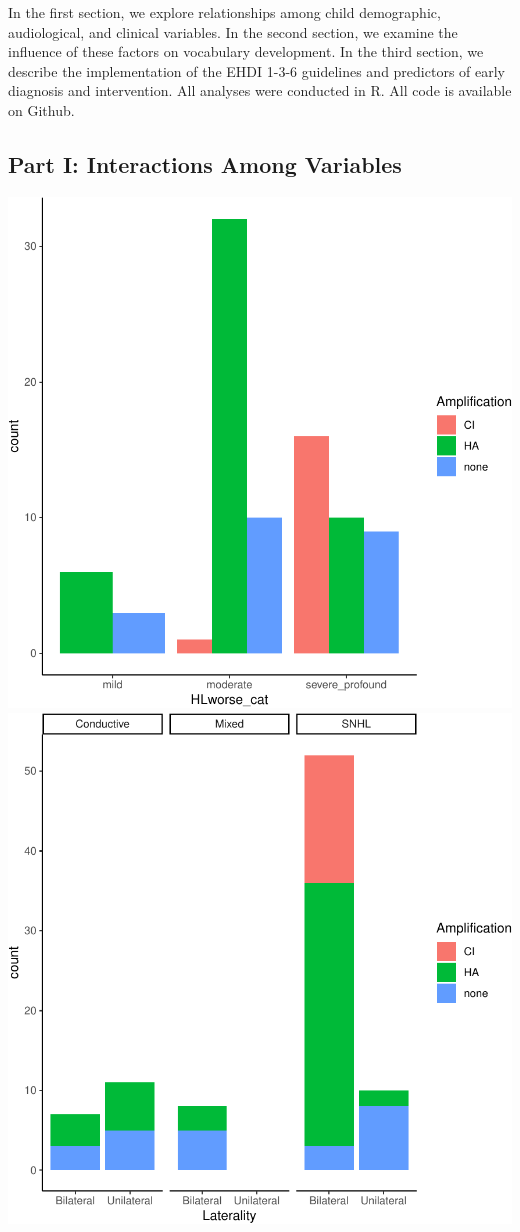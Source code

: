 \documentclass[english,man]{apa6}
\begin{document}
In the first section, we explore relationships among child demographic, audiological, and clinical variables. In the second section, we examine the influence of these factors on vocabulary development. In the third section, we describe the implementation of the EHDI 1-3-6 guidelines and predictors of early diagnosis and intervention. All analyses were conducted in R. All code is available on Github.

\hypertarget{part-i-interactions-among-variables}{%
\subsection{Part I: Interactions Among Variables}\label{part-i-interactions-among-variables}}

\includegraphics{ELSSP_paper_files/figure-latex/graphs-for-eb-1.pdf} \includegraphics{ELSSP_paper_files/figure-latex/graphs-for-eb-2.pdf}
\end{document}
